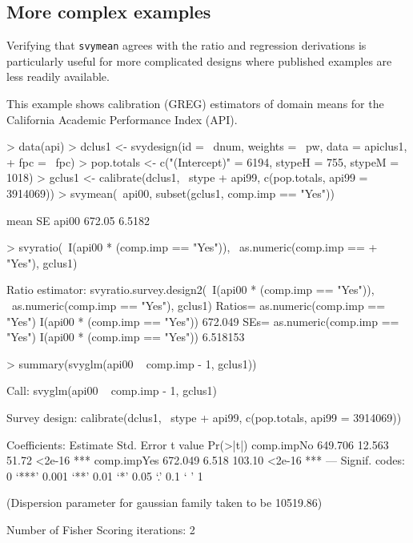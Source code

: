 \documentclass{article}
\begin{document}
\subsection*{More complex examples}
Verifying that \texttt{svymean} agrees with the ratio and regression
derivations is particularly useful for more complicated designs where
published examples are less readily available.

This example shows calibration (GREG) estimators of domain means for
the California Academic Performance Index (API).
\begin{Schunk}
\begin{Sinput}
> data(api)
> dclus1 <- svydesign(id = ~dnum, weights = ~pw, data = apiclus1, 
+     fpc = ~fpc)
> pop.totals <- c("(Intercept)" = 6194, stypeH = 755, stypeM = 1018)
> gclus1 <- calibrate(dclus1, ~stype + api99, c(pop.totals, api99 = 3914069))
> svymean(~api00, subset(gclus1, comp.imp == "Yes"))
\end{Sinput}
\begin{Soutput}
        mean     SE
api00 672.05 6.5182
\end{Soutput}
\begin{Sinput}
> svyratio(~I(api00 * (comp.imp == "Yes")), ~as.numeric(comp.imp == 
+     "Yes"), gclus1)
\end{Sinput}
\begin{Soutput}
Ratio estimator: svyratio.survey.design2(~I(api00 * (comp.imp == "Yes")), ~as.numeric(comp.imp == 
    "Yes"), gclus1)
Ratios=
                               as.numeric(comp.imp == "Yes")
I(api00 * (comp.imp == "Yes"))                       672.049
SEs=
                               as.numeric(comp.imp == "Yes")
I(api00 * (comp.imp == "Yes"))                      6.518153
\end{Soutput}
\begin{Sinput}
> summary(svyglm(api00 ~ comp.imp - 1, gclus1))
\end{Sinput}
\begin{Soutput}
Call:
svyglm(api00 ~ comp.imp - 1, gclus1)

Survey design:
calibrate(dclus1, ~stype + api99, c(pop.totals, api99 = 3914069))

Coefficients:
            Estimate Std. Error t value Pr(>|t|)    
comp.impNo   649.706     12.563   51.72   <2e-16 ***
comp.impYes  672.049      6.518  103.10   <2e-16 ***
---
Signif. codes:  0 ‘***’ 0.001 ‘**’ 0.01 ‘*’ 0.05 ‘.’ 0.1 ‘ ’ 1 

(Dispersion parameter for gaussian family taken to be 10519.86)

Number of Fisher Scoring iterations: 2
\end{Soutput}
\end{Schunk}
\end{document}
